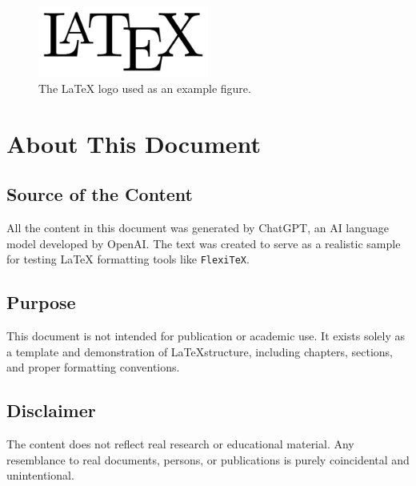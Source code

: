 \documentclass{report}
\begin{document}
\begin{figure}[h]
    \centering
    \includegraphics[width=0.5\textwidth]{figs/logo.png}
    \caption{The LaTeX logo used as an example figure.}
    \label{fig:latex-logo}
\end{figure}

\chapter{About This Document}

\section{Source of the Content}
All the content in this document was generated by ChatGPT, an AI language model developed by OpenAI. The text was created to serve as a realistic sample for testing LaTeX formatting tools like \texttt{Flexi\TeX}.

\section{Purpose}
This document is not intended for publication or academic use. It exists solely as a template and demonstration of \LaTeX structure, including chapters, sections, and proper formatting conventions.

\section{Disclaimer}
The content does not reflect real research or educational material. Any resemblance to real documents, persons, or publications is purely coincidental and unintentional.
\end{document}

